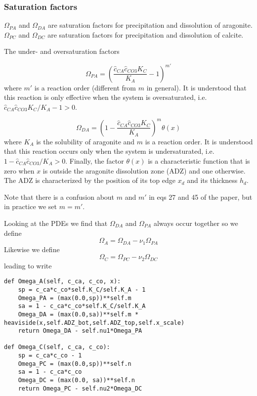 \documentclass[a4paper]{article}
\begin{document}
\subsubsection*{Saturation factors}

$\Omega_{PA}$ and $\Omega_{DA}$ are saturation factors for precipitation 
and dissolution of aragonite. 
$\Omega_{PC}$ and $\Omega_{DC}$ are saturation factors for precipitation 
and dissolution of calcite.

The under- and oversaturation factors 

\[
\Omega_{PA}=\left( \frac{\hat{c}_{CA} \hat{c}_{CO3} K_C}{K_A} -1 \right)^{m'}
\]
where $m'$ is a reaction order (different from $m$ in general).
It is understood that this reaction is only effective when the
system is oversaturated, i.e. $\hat{c}_{CA} \hat{c}_{CO3} K_C/K_A -1 >0$.

\[
\Omega_{DA}= \left(1-\frac{\hat{c}_{CA} \hat{c}_{CO3} K_C}{K_A}  \right)^m \theta(x)
\]
where $K_A$ is the solubility of aragonite and $m$ is a reaction
order. It is understood that this reaction occurs only when
the system is undersaturated,
i.e. $1-\hat{c}_{CA} \hat{c}_{CO3}/K_A >0$.
Finally,
the factor $\theta(x)$ is a characteristic function that is zero when
$x$ is outside the aragonite dissolution zone (ADZ) and one
otherwise. The ADZ is characterized by the position of its top
edge $x_d$ and its thickness $h_d$.

Note that there is a confusion about $m$ and $m'$
in eqs 27 and 45 of the paper, but in practice we set $m=m'$.

Looking at the PDEs we find that $\Omega_{DA}$ and $\Omega_{PA}$
always occur together so we define
\[
\Omega_A=\Omega_{DA}-\nu_1\Omega_{PA} 
\]
Likewise we define
\[
\Omega_C=\Omega_{PC}-\nu_2\Omega_{DC}
\]
leading to write

\begin{lstlisting}
def Omega_A(self, c_ca, c_co, x):
    sp = c_ca*c_co*self.K_C/self.K_A - 1
    Omega_PA = (max(0.0,sp))**self.m
    sa = 1 - c_ca*c_co*self.K_C/self.K_A
    Omega_DA = (max(0.0,sa))**self.m * heaviside(x,self.ADZ_bot,self.ADZ_top,self.x_scale)
    return Omega_DA - self.nu1*Omega_PA

def Omega_C(self, c_ca, c_co):
    sp = c_ca*c_co - 1
    Omega_PC = (max(0.0,sp))**self.n
    sa = 1 - c_ca*c_co
    Omega_DC = (max(0.0, sa))**self.n
    return Omega_PC - self.nu2*Omega_DC
\end{lstlisting}

\end{document}
